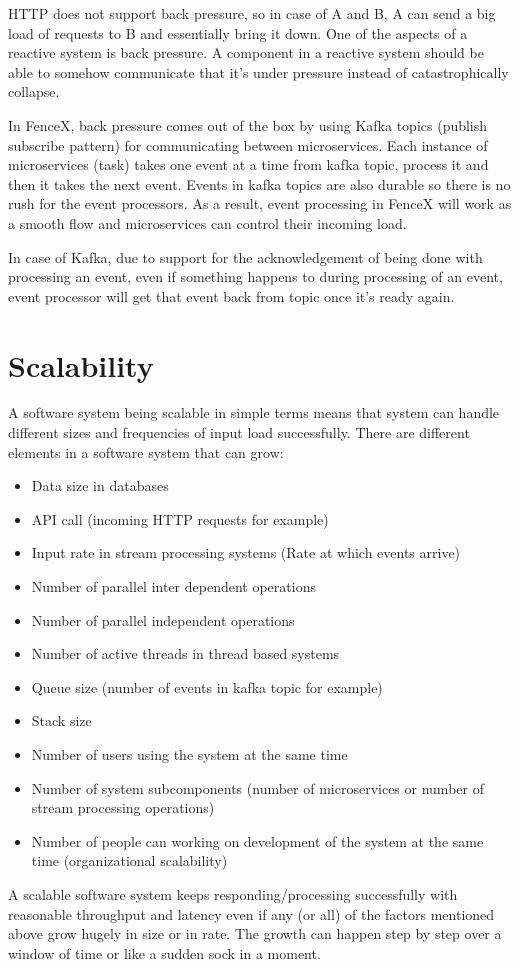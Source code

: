 \documentclass[a4]{report}
\begin{document}
    HTTP does not support back pressure, so in case of A and B, A can send a big load of requests to B and
    essentially bring it down.
    One of the aspects of a reactive system is back pressure.
    A component in a reactive system should be able to somehow communicate that it's under pressure instead of
    catastrophically collapse.

    In FenceX, back pressure comes out of the box by using Kafka topics (publish subscribe pattern) for communicating
    between microservices.
    Each instance of microservices (task) takes one event at a time from kafka topic, process it and then it takes
    the next event.
    Events in kafka topics are also durable so there is no rush for the event processors.
    As a result, event processing in FenceX will work as a smooth flow and microservices can control their incoming load.

    In case of Kafka, due to support for the acknowledgement of being done with processing an event, even if
    something happens to during processing of an event, event processor will get that event back from topic once it's
    ready again.


    \section{Scalability}
    A software system being scalable in simple terms means that system can handle different sizes and frequencies of
    input load successfully.
    There are different elements in a software system that can grow:
    \begin{itemize}
        \item Data size in databases
        \item API call (incoming HTTP requests for example)
        \item Input rate in stream processing systems (Rate at which events arrive)
        \item Number of parallel inter dependent operations
        \item Number of parallel independent operations
        \item Number of active threads in thread based systems
        \item Queue size (number of events in kafka topic for example)
        \item Stack size
        \item Number of users using the system at the same time
        \item Number of system subcomponents (number of microservices or number of stream processing operations)
        \item Number of people can working on development of the system at the same time (organizational scalability)
    \end{itemize}
    A scalable software system keeps responding/processing successfully with reasonable throughput and latency even if
    any (or all) of the factors mentioned above grow hugely in size or in rate.
    The growth can happen step by step over a window of time or like a sudden sock in a moment.
\end{document}
